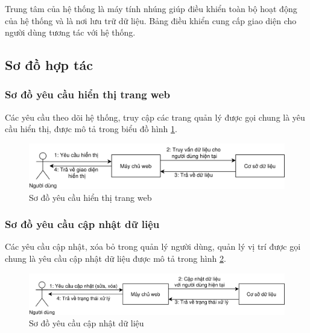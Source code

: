 Trung tâm của hệ thống là máy tính nhúng giúp điều khiển toàn bộ hoạt động của hệ thống và là nơi lưu trữ dữ liệu. Bảng điều khiển cung cấp giao diện cho người dùng tương tác với hệ thống.





\subsection{Sơ đồ hợp tác}
\subsubsection{Sơ đồ yêu cầu hiển thị trang web}

Các yêu cầu theo dõi hệ thống, truy cập các trang quản lý được gọi chung là yêu cầu hiển thị, được mô tả trong biểu đồ hình \ref{fig:collab-show}.
\begin{figure}[h]
	\centering
	\includegraphics[width=0.8\linewidth]{images/collab-show}
	\caption{Sơ đồ yêu cầu hiển thị trang web}
	\label{fig:collab-show}
\end{figure}

\subsubsection{Sơ đồ yêu cầu cập nhật dữ liệu}
Các yêu cầu cập nhật, xóa bỏ trong quản lý người dùng, quản lý vị trí được gọi chung là yêu cầu cập nhật dữ liệu được mô tả trong hình \ref{fig:collab-update}.
\begin{figure}[H]
	\centering
	\includegraphics[width=0.8\linewidth]{images/collab-update}
	\caption{Sơ đồ yêu cầu cập nhật dữ liệu}
	\label{fig:collab-update}
\end{figure}

